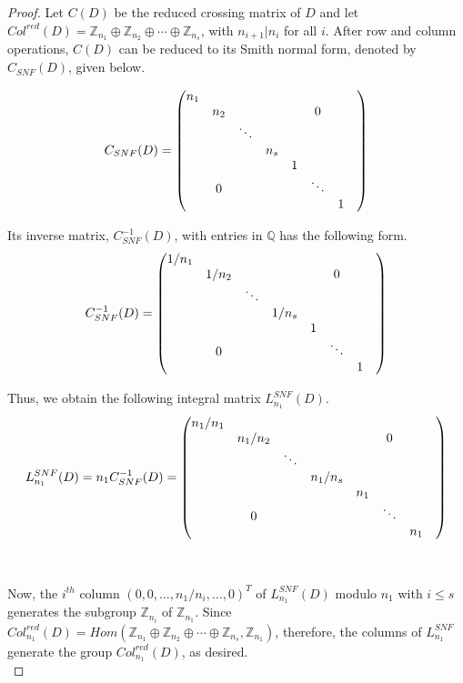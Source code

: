 \documentclass[11pt]{amsart}
\begin{document}
\begin{proof}

 Let $C(D)$ be the reduced crossing matrix of $D$ and let $Col^{red}(D) = \mathbb Z_{n_1}\oplus \mathbb Z_{n_2}\oplus \cdots \oplus \mathbb Z_{n_s}$, with $n_{i+1} | n_i$ for all $i$. After row and column operations, $C(D)$ can be reduced to its Smith normal form, denoted by $C_{SNF}(D)$, given below.

\begin{equation*}
C_{SNF}(D) =
\begin{pmatrix}
    n_{1} & &  && \\
    &n_{2} &  &&&\text{\Huge0}& \\
    & & \ddots&&& \\
    & &&n_s && \\
     &&&&1 && \\
&\text{\Huge0}&&&&\ddots &&\\
    & & &&&& 1
  \end{pmatrix}
\end{equation*}

Its inverse matrix, $C^{-1}_{SNF}(D)$, with entries in $\mathbb{Q}$ has the following form.
\begin{equation*}
C^{-1}_{SNF}(D) =
\begin{pmatrix}
    1/n_{1} & &  && \\
    &1/n_{2} &  &&&\text{\Huge0}& \\
    & & \ddots&&& \\
    & &&1/n_s && \\
     &&&&1 && \\
&\text{\Huge0}&&&&\ddots &&\\
    & & &&&& 1
  \end{pmatrix}
\end{equation*}

Thus, we obtain the following integral matrix $L^{SNF}_{n_1}(D)$.
\begin{equation*}
L^{SNF}_{n_1}(D)=n_1 C^{-1}_{SNF}(D)=
\begin{pmatrix}
    n_1/n_{1} & &  && \\
    &n_1/n_{2} &  &&&\text{\Huge0}& \\
    & & \ddots&&& \\
    & &&n_1/n_s && \\
     &&&&n_1 && \\
&\text{\Huge0}&&&&\ddots &&\\
    & & &&&& n_1
  \end{pmatrix}
\end{equation*}

\

Now, the $i^{\mathit{th}}$ column $(0, 0, \dots, n_{1}/n_{i}, \dots, 0)^T$ of $L^{SNF}_{n_1}(D)$ modulo $n_1$  with $i \le s$ generates the subgroup  $\mathbb{Z}_{n_i}$ of $\mathbb{Z}_{n_1}$. Since $Col^{red}_{n_1}(D) = Hom(\mathbb Z_{n_1}\oplus \mathbb Z_{n_2}\oplus \cdots  \oplus \mathbb Z_{n_s},  \mathbb Z_{n_1})$, therefore, the columns of $L^{SNF}_{n_1}$ generate the group $Col^{red}_{n_1}(D)$, as desired.\\
\end{proof}
\end{document}
